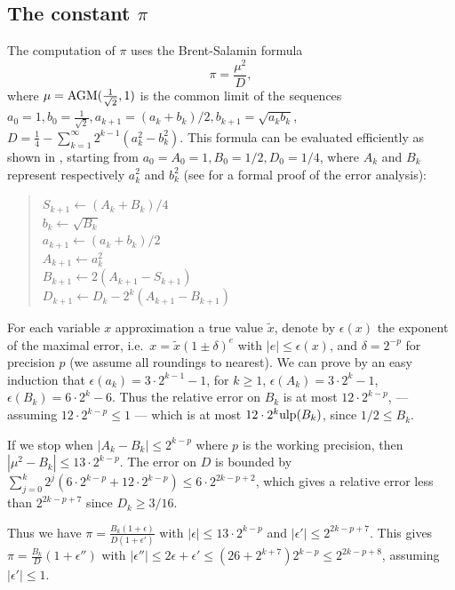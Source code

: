 \documentclass[12pt]{amsart}
\def\ulp{{\rm ulp}}
\begin{document}
\subsection{The constant $\pi$}

The computation of $\pi$ uses the Brent-Salamin formula
\[ \pi = \frac{\mu^2}{D}, \]
where $\mu = {\rm AGM}(\frac{1}{\sqrt{2}}, 1)$ is the common limit
of the sequences $a_0=1, b_0 = \frac{1}{\sqrt{2}},
a_{k+1} = (a_k+b_k)/2, b_{k+1} = \sqrt{a_k b_k}$,
$D=\frac{1}{4} - \sum_{k=1}^{\infty} 2^{k-1} (a_k^2-b_k^2)$.
This formula can be evaluated efficiently as shown in \cite{ScGrVe94},
starting from $a_0 = A_0 = 1, B_0 = 1/2, D_0 = 1/4$, where $A_k$ and
$B_k$ represent respectively $a_k^2$ and $b_k^2$
(see \cite{bertot:hal-01582524} for a formal proof of the error analysis):
\begin{quote}
$S_{k+1} \leftarrow (A_k + B_k)/4$ \\
$b_k \leftarrow \sqrt{B_k}$ \\
$a_{k+1} \leftarrow (a_k + b_k)/2$ \\
$A_{k+1} \leftarrow a_k^2$ \\
$B_{k+1} \leftarrow 2 (A_{k+1} - S_{k+1})$ \\
$D_{k+1} \leftarrow D_k - 2^k (A_{k+1} - B_{k+1})$
\end{quote}
For each variable $x$ approximation a true value $\tilde{x}$,
denote by $\epsilon(x)$ the exponent of the maximal error,
i.e.\ $x = \tilde{x} (1\pm\delta)^e$ with $|e| \leq \epsilon(x)$,
and $\delta = 2^{-p}$ for precision $p$ (we assume all roundings to
nearest).
We can prove by an easy induction that $\epsilon(a_k) = 3 \cdot 2^{k-1} - 1$,
for $k \geq 1$, $\epsilon(A_k) = 3 \cdot 2^k - 1$,
$\epsilon(B_k) = 6 \cdot 2^k - 6$.
Thus the relative error on $B_k$ is at most $12 \cdot 2^{k-p}$,
--- assuming $12 \cdot 2^{k-p} \leq 1$ ---
which is at most $12 \cdot 2^k \ulp(B_k)$, since $1/2 \leq B_k$.

If we stop when $|A_k-B_k| \leq 2^{k-p}$ where $p$ is the working precision,
then $|\mu^2 - B_k| \leq 13 \cdot 2^{k-p}$.
The error on $D$ is bounded by $\sum_{j=0}^k 2^{j} (6 \cdot 2^{k-p} +
12 \cdot 2^{k-p}) \leq 6 \cdot 2^{2k-p+2}$, which gives a relative error less
than $2^{2k-p+7}$ since $D_k \geq 3/16$.

Thus we have $\pi = \frac{B_k (1+\epsilon)}{D (1+\epsilon')}$
with $|\epsilon| \leq 13 \cdot 2^{k-p}$ and $|\epsilon'| \leq 2^{2k-p+7}$.
This gives $\pi = \frac{B_k}{D} (1+\epsilon'')$ with
$|\epsilon''| \leq 2 \epsilon + \epsilon' \leq (26 + 2^{k+7}) 2^{k-p}
\leq 2^{2k-p+8}$, assuming $|\epsilon'| \leq 1$.
\end{document}
